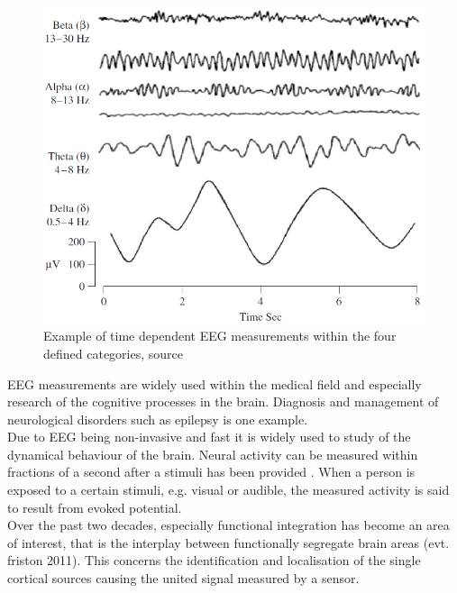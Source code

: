 \begin{figure}[H]
\begin{minipage}[t]{.45\textwidth}
        \centering
        \includegraphics[width=\textwidth]{figurs/EEG_example.png}
        \caption{Example of time dependent EEG measurements within the four defined categories, source \cite{EEGsignalprocessing}}\label{fig:EEG_example}
    \end{minipage}
\end{figure}
\noindent
EEG measurements are widely used within the medical field and especially research of the cognitive processes in the brain. Diagnosis and management of neurological disorders such as epilepsy is one example. 
\\   
Due to EEG being non-invasive and fast it is widely used to study of the dynamical behaviour of the brain. Neural activity can be measured within fractions of a second after a stimuli has been provided \cite[p. 3]{fundamentalEEG}. When a person is exposed to a certain stimuli, e.g. visual or audible, the measured activity is said to result from evoked potential.
\\
Over the past two decades, especially functional integration has become an area of interest, that is the interplay between functionally segregate brain areas \cite{Van2019}(evt. friston 2011). This concerns the identification and localisation of the single cortical sources causing the united signal measured by a sensor.
\\ 
\\

